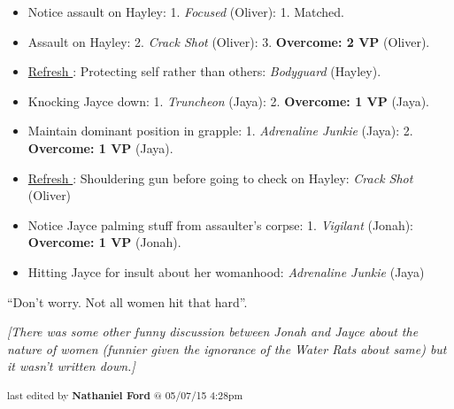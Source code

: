 {\begin{itemize}
\item Notice assault on Hayley: 1.  \textit{Focused} (Oliver): 1.  Matched.
\item Assault on Hayley: 2.\textit{  Crack Shot} (Oliver): 3.  \textbf{Overcome: 2 VP} (Oliver).
\item \underline{ Refresh }: Protecting self rather than others:\textit{ Bodyguard} (Hayley).
\item Knocking Jayce down: 1.  \textit{Truncheon} (Jaya): 2.  \textbf{Overcome: 1 VP} (Jaya).
\item Maintain dominant position in grapple: 1.  \textit{Adrenaline Junkie} (Jaya): 2.  \textbf{Overcome: 1 VP} (Jaya).
\item \underline{ Refresh }: Shouldering gun before going to check on Hayley:\textit{ Crack Shot} (Oliver)
\item Notice Jayce palming stuff from assaulter's corpse: 1.  \textit{Vigilant} (Jonah):  \textbf{Overcome: 1 VP} (Jonah).
\item Hitting Jayce for insult about her womanhood:\textit{ Adrenaline Junkie} (Jaya)
\end{itemize}

}





``Don't worry.  Not all women hit that hard''.






\textit{{[}}\textit{There was some other funny discussion between Jonah and Jayce about the nature of women (funnier given the ignorance of the Water Rats about same) but it wasn't written down.{]}}


\vspace{\fill}

\begin{flushright}
\textsubscript{last edited by \textbf{Nathaniel Ford} @ 05/07/15 4:28pm}
\end{flushright}


